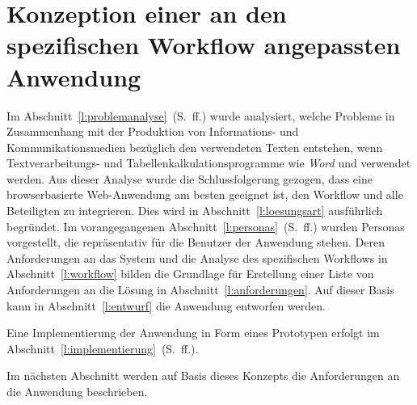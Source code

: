 \section{Konzeption einer an den spezifischen Workflow angepassten Anwendung}\label{l:konzeption}

Im Abschnitt~\ref{l:problemanalyse}~(S.\pageref{l:problemanalyse}~ff.) wurde analysiert, welche Probleme in Zusammenhang mit der Produktion von Informations- und Kommunikationsmedien bezüglich den verwendeten Texten entstehen, wenn Textverarbeitungs- und Tabellenkalkulationsprogramme wie  \emph{Word} und  verwendet werden. Aus dieser Analyse wurde die Schlussfolgerung gezogen, dass eine browserbasierte Web-Anwendung am besten geeignet ist, den Workflow und alle Beteiligten zu integrieren. Dies wird in Abschnitt~\ref{l:loesungsart} ausführlich begründet. Im vorangegangenen Abschnitt~\ref{l:personas}~(S.\pageref{l:personas}~ff.) wurden Personas vorgestellt, die repräsentativ für die Benutzer der Anwendung stehen. Deren Anforderungen an das System und die Analyse des spezifischen Workflows in Abschnitt~\ref{l:workflow} bilden die Grundlage für Erstellung einer Liste von Anforderungen an die Lösung in Abschnitt~\ref{l:anforderungen}. Auf dieser Basis kann in Abschnitt~\ref{l:entwurf} die Anwendung entworfen werden.

\bigskip

Eine Implementierung der Anwendung in Form eines Prototypen erfolgt im Abschnitt~\ref{l:implementierung}~(S.\pageref{l:implementierung}~ff.).







\bigskip

Im nächsten Abschnitt werden auf Basis dieses Konzepts die Anforderungen an die Anwendung beschrieben.

\pagebreak